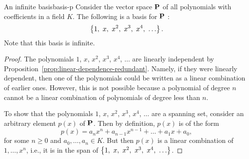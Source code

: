 \begin{example}{An infinite basis}{basis-p}
  Consider the vector space $\mathbf{P}$ of all polynomials with
  coefficients in a field $K$. The following is a basis for $\mathbf{P}$%
  :
  \begin{equation*}
    \left\{1,~ x,~ x^2,~ x^3,~ x^4,~ \ldots\right\}.
  \end{equation*}
  Note that this basis is infinite.
\end{example}

\begin{proof}
  The polynomials $1$, $x$, $x^2$, $x^3$, $x^4$, $\ldots$ are linearly
  independent by Proposition~\ref{prop:linear-dependence-redundant}.
  Namely, if they were linearly dependent, then one of the polynomials
  could be written as a linear combination of earlier ones. However,
  this is not possible because a polynomial of degree $n$ cannot be a
  linear combination of polynomials of degree less than $n$.

  To show that the polynomials $1$, $x$, $x^2$, $x^3$, $x^4$, $\ldots$
  are a spanning set, consider an arbitrary element $p(x)$ of $\mathbf{P}$.
  Then by definition, $p(x)$ is of the form
  \begin{equation*}
    p(x) = a_nx^n + a_{n-1}x^{n-1} + \ldots + a_1x + a_0,
  \end{equation*}
  for some $n\geq 0$ and $a_0,\ldots,a_n\in K$. But then $p(x)$ is a
  linear combination of $1,\ldots,x^n$, i.e., it is in the span of
  $\left\{1,~ x,~ x^2,~ x^3,~ x^4,~ \ldots\right\}$.
\end{proof}

